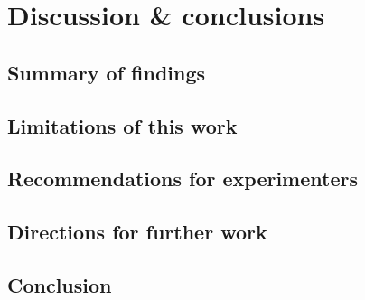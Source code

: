 
\chapter{Discussion \& conclusions}

\section{Summary of findings}

\section{Limitations of this work}

\section{Recommendations for experimenters}

\section{Directions for further work}

\section{Conclusion}
